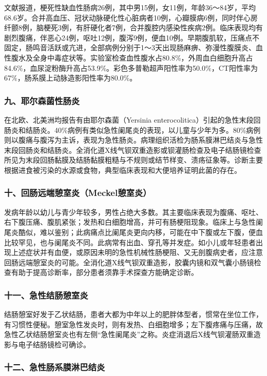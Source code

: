 文献报道，梗死性缺血性肠病26例，其中男15例，女11例，年龄36～84岁，平均68.6岁。合并高血压、冠状动脉硬化性心脏病者10例，心瓣膜病6例，同时伴心房纤颤8例，脑梗死3例，有肝硬化者7例，合并腹腔内感染性疾病2例。临床表现均有剧烈腹痛，伴恶心24例，呕吐12例，腹泻9例，便血10例。早期腹肌软，压痛点不固定，肠鸣音活跃或亢进，全部病例分别于1～3天出现肠麻痹、弥漫性腹膜炎、血性腹水及全身中毒症状等。实验室检查血性腹水占80.8\%，外周血白细胞升高占84.6\%，血尿淀粉酶升高占53.9\%。彩色多普勒超声阳性率为50.0\%，CT阳性率为67\%，肠系膜上动脉造影阳性率为80.0\%。

\subsubsection{九、耶尔森菌性肠炎}

在北欧、北美洲均报告有由耶尔森菌（Yersinia
enterocolitica）引起的急性末段回肠炎和结肠炎。40\%病例有类似急性阑尾炎的表现，以儿童与少年为多。80\%病例则以腹痛与腹泻为主诉，表现为急性肠炎。病理组织活检为肠系膜淋巴结炎与急性末段回肠炎和结肠炎。全消化道X线气钡双重造影或钡灌肠检查及电子结肠镜检查所见为末段回肠黏膜及结肠黏膜粗糙与不规则或结节样变、溃疡征象等。诊断主要根据进食被污染的水源或食物，典型临床表现和大便培养证明此菌的存在。

\subsubsection{十、回肠远端憩室炎（Meckel憩室炎）}

发病年龄以幼儿与青少年较多，男性占绝大多数。其主要临床表现为腹痛、呕吐、右下腹压痛、腹肌紧张；发热和白细胞增高，并可有肠梗阻现象。临床上与急性阑尾炎酷似，难以鉴别；此病痛点比阑尾炎更向内移，可能在中下腹或左下腹，便血比较罕见，也与阑尾炎不同。此病常有出血、穿孔等并发症。如小儿或年轻患者出现上述症状并有血便，或原因未明的急性机械性肠梗阻、又无剖腹病史者，应注意回肠远端憩室炎的可能。全消化道X线气钡双重造影，胶囊内镜和双气囊小肠镜检查有助于提高诊断率，部分患者须靠手术探查方能确定诊断。

\subsubsection{十一、急性结肠憩室炎}

结肠憩室好发于乙状结肠，患者大都为中年以上的肥胖体型者，惯常在坐位工作，有习惯性便秘。憩室急性发炎时，则有发热、白细胞增多；左下腹疼痛与压痛，故急性乙状结肠憩室炎也有左侧“急性阑尾炎”之称。炎症消退后X线气钡灌肠双重造影与电子结肠镜检可确诊。

\subsubsection{十二、急性肠系膜淋巴结炎}

